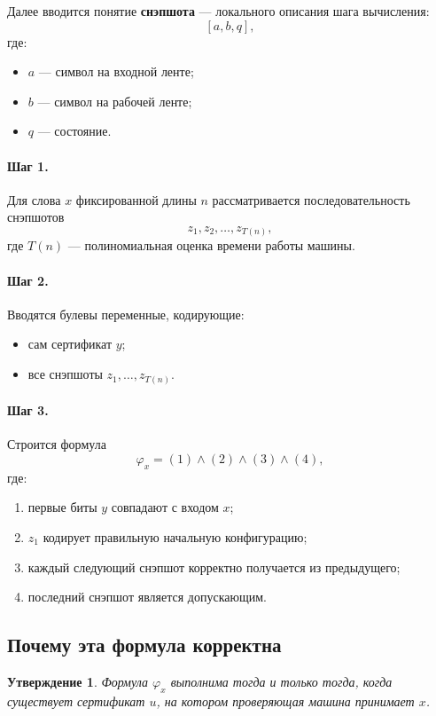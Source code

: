 \documentclass[12pt,a4paper]{article}
\theoremstyle{definition}
\theoremstyle{plain}
\newtheorem{proposition}{Утверждение}[section]
\begin{document}
Далее вводится понятие \textbf{снэпшота} --- локального описания шага вычисления:
\[
[a,b,q],
\]
где:
\begin{itemize}
\item $a$ --- символ на входной ленте;
\item $b$ --- символ на рабочей ленте;
\item $q$ --- состояние.
\end{itemize}

\paragraph{Шаг 1.}
Для слова $x$ фиксированной длины $n$ рассматривается последовательность снэпшотов
\[
z_1,z_2,\dots,z_{T(n)},
\]
где $T(n)$ --- полиномиальная оценка времени работы машины.

\paragraph{Шаг 2.}
Вводятся булевы переменные, кодирующие:
\begin{itemize}
\item сам сертификат $y$;
\item все снэпшоты $z_1,\dots,z_{T(n)}$.
\end{itemize}

\paragraph{Шаг 3.}
Строится формула
\[
\varphi_x=(1)\wedge(2)\wedge(3)\wedge(4),
\]
где:
\begin{enumerate}
\item первые биты $y$ совпадают с входом $x$;
\item $z_1$ кодирует правильную начальную конфигурацию;
\item каждый следующий снэпшот корректно получается из предыдущего;
\item последний снэпшот является допускающим.
\end{enumerate}

\subsection{Почему эта формула корректна}
\begin{proposition}
Формула $\varphi_x$ выполнима тогда и только тогда, когда существует сертификат $u$, на котором проверяющая машина принимает $x$.
\end{proposition}
\end{document}
